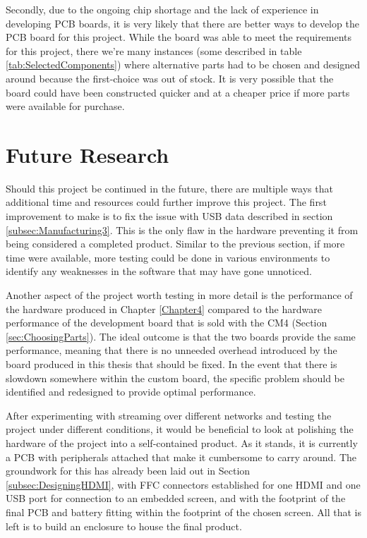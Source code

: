 Secondly, due to the ongoing chip shortage and the lack of experience in developing PCB boards, it is very likely that there are better ways to develop the PCB board for this project.
While the board was able to meet the requirements for this project, there we're many instances (some described in table \ref{tab:SelectedComponents}) where alternative parts had to be chosen and designed around because the first-choice was out of stock.
It is very possible that the board could have been constructed quicker and at a cheaper price if more parts were available for purchase.


\section{Future Research}\label{sec:ConclusionFutureResearch}

Should this project be continued in the future, there are multiple ways that additional time and resources could further improve this project.
The first improvement to make is to fix the issue with USB data described in section \ref{subsec:Manufacturing3}.
This is the only flaw in the hardware preventing it from being considered a completed product.
Similar to the previous section, if more time were available, more testing could be done in various environments to identify any weaknesses in the software that may have gone unnoticed.

Another aspect of the project worth testing in more detail is the performance of the hardware produced in Chapter \ref{Chapter4} compared to the hardware performance of the development board that is sold with the CM4 (Section \ref{sec:ChoosingParts}).
The ideal outcome is that the two boards provide the same performance, meaning that there is no unneeded overhead introduced by the board produced in this thesis that should be fixed.
In the event that there is slowdown somewhere within the custom board, the specific problem should be identified and redesigned to provide optimal performance.

After experimenting with streaming over different networks and testing the project under different conditions, it would be beneficial to look at polishing the hardware of the project into a self-contained product.
As it stands, it is currently a PCB with peripherals attached that make it cumbersome to carry around.
The groundwork for this has already been laid out in Section \ref{subsec:DesigningHDMI}, with FFC connectors established for one HDMI and one USB port for connection to an embedded screen, and with the footprint of the final PCB and battery fitting within the footprint of the chosen screen.
All that is left is to build an enclosure to house the final product.